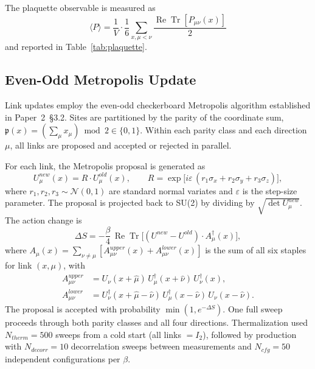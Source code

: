 \documentclass[12pt,a4paper]{article}
\renewcommand{\Re}{\operatorname{Re}}
\newcommand{\Tr}{\operatorname{Tr}}
\newcommand{\sigx}{\sigma_x}
\newcommand{\sigy}{\sigma_y}
\newcommand{\sigz}{\sigma_z}
\def\mathrm#1{#1}%
\begin{document}
	The plaquette observable is measured as
	\begin{equation}
		\langle P\rangle = \frac{1}{V}\cdot\frac{1}{6}\sum_{x,\mu<\nu}
		\frac{\Re\Tr[P_{\mu\nu}(x)]}{2}
	\end{equation}
	and reported in Table~\ref{tab:plaquette}.
	
	\subsection{Even-Odd Metropolis Update}
	
	Link updates employ the even-odd checkerboard Metropolis algorithm established in
	Paper~2~\S3.2.  Sites are partitioned by the parity of the coordinate sum,
	$\mathfrak{p}(x)=(\sum_\mu x_\mu)\bmod 2\in\{0,1\}$.  Within each parity class
	and each direction $\mu$, all links are proposed and accepted or rejected in
	parallel.
	
	For each link, the Metropolis proposal is generated as
	\begin{equation}
		U_\mu^{\mathrm{new}}(x) = R\cdot U_\mu^{\mathrm{old}}(x),\qquad
		R = \exp\!\bigl[i\varepsilon\,(r_1\sigx+r_2\sigy+r_3\sigz)\bigr],
	\end{equation}
	where $r_1,r_2,r_3\sim\mathcal{N}(0,1)$ are standard normal variates and
	$\varepsilon$ is the step-size parameter.  The proposal is projected back to SU(2)
	by dividing by $\sqrt{\det U_\mu^{\mathrm{new}}}$.  The action change is
	\begin{equation}\label{eq:deltaS}
		\Delta S = -\frac{\beta}{4}\,\Re\Tr\!\bigl[(U^{\mathrm{new}}-U^{\mathrm{old}})
		\cdot A^\dagger_\mu(x)\bigr],
	\end{equation}
	where $A_\mu(x)=\sum_{\nu\neq\mu}[A^{\mathrm{upper}}_{\mu\nu}(x)
	+A^{\mathrm{lower}}_{\mu\nu}(x)]$ is the sum of all six staples for link
	$(x,\mu)$, with
	\begin{align}
		A^{\mathrm{upper}}_{\mu\nu} &= U_\nu(x+\hat\mu)\,U_\mu^\dagger(x+\hat\nu)\,
		U_\nu^\dagger(x),\\
		A^{\mathrm{lower}}_{\mu\nu} &= U_\nu^\dagger(x+\hat\mu-\hat\nu)\,
		U_\mu^\dagger(x-\hat\nu)\,U_\nu(x-\hat\nu).
	\end{align}
	The proposal is accepted with probability $\min(1,e^{-\Delta S})$.  One full sweep
	proceeds through both parity classes and all four directions.  Thermalization used
	$N_{\mathrm{therm}}=500$ sweeps from a cold start (all links $=I_2$), followed by
	production with $N_{\mathrm{decorr}}=10$ decorrelation sweeps between measurements
	and $N_{\mathrm{cfg}}=50$ independent configurations per $\beta$.
	
\end{document}
